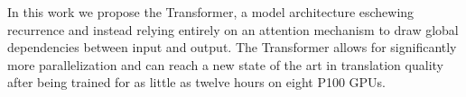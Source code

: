 In this work we propose the Transformer, a model architecture eschewing recurrence and instead relying entirely on an attention mechanism to draw global dependencies between input and output. The Transformer allows for significantly more parallelization and can reach a new state of the art in translation quality after being trained for as little as twelve hours on eight P100 GPUs. 


